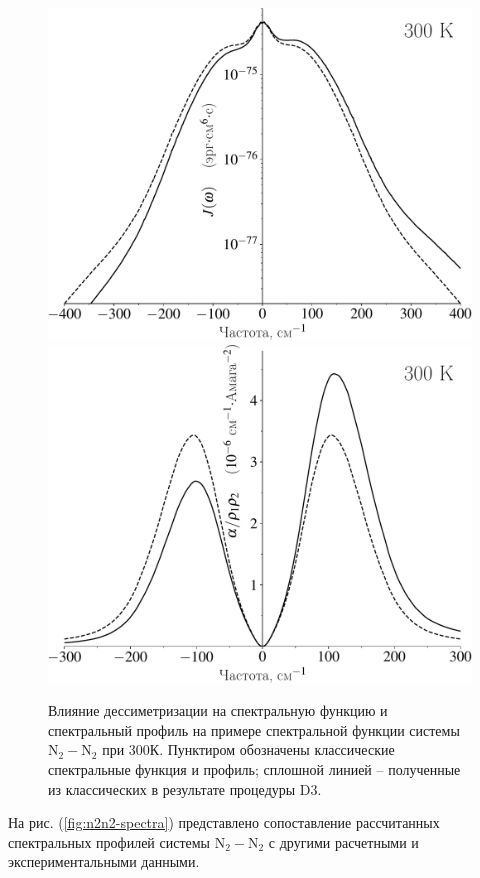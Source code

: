 \begin{figure}[H]
    \centering
    \includegraphics[width=0.49\linewidth]{./pictures/polyatom_spectra/n2n2_spectral_function_300K-crop.pdf}
    \includegraphics[width=0.49\linewidth]{./pictures/polyatom_spectra/n2n2_desymmetrization-crop.pdf}
    \caption{Влияние дессиметризации на спектральную функцию и спектральный профиль на примере спектральной функции системы N$_2-$N$_2$ при 300К. Пунктиром обозначены классические спектральные функция и профиль; сплошной линией -- полученные из классических в результате процедуры D3.}
    \label{fig:n2n2-desymmetrization}
\end{figure}

На рис. (\ref{fig:n2n2-spectra}) представлено сопоставление рассчитанных спектральных профилей системы N$_2-$N$_2$ с другими расчетными и экспериментальными данными.

